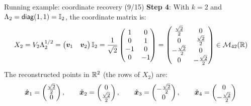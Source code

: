 \documentclass[aspectratio=169]{beamer}\usepackage[]{graphicx}\usepackage[]{xcolor}
\begin{document}
\begin{frame}{Running example: coordinate recovery (9/15)}
\textbf{Step 4}: With $k = 2$ and $\Lambda_2 = \mathsf{diag}(1, 1) = \mathbb{I}_2$, the coordinate matrix is:
\[
X_2 = V_2 \Lambda_2^{1/2} = \begin{pmatrix} \bm{v}_1 & \bm{v}_2 \end{pmatrix} \mathbb{I}_2 =
\frac{1}{\sqrt{2}}\begin{pmatrix}
1 & 0 \\
0 & 1 \\
-1 & 0 \\
0 & -1
\end{pmatrix}
= \begin{pmatrix}
\frac{\sqrt{2}}{2} & 0 \\
0 & \frac{\sqrt{2}}{2} \\
-\frac{\sqrt{2}}{2} & 0 \\
0 & -\frac{\sqrt{2}}{2}
\end{pmatrix} \in \mathcal{M}_{42}(\mathbb{R})
\]
\vfill
The reconstructed points in $\mathbb{R}^2$ (the rows of $X_2$) are:
\[
\hat{\bm{x}}_1 = \begin{pmatrix} \frac{\sqrt{2}}{2} \\ 0 \end{pmatrix}, \qquad
\hat{\bm{x}}_2 = \begin{pmatrix} 0 \\ \frac{\sqrt{2}}{2} \end{pmatrix}, \qquad
\hat{\bm{x}}_3 = \begin{pmatrix} -\frac{\sqrt{2}}{2} \\ 0 \end{pmatrix}, \qquad
\hat{\bm{x}}_4 = \begin{pmatrix} 0 \\ -\frac{\sqrt{2}}{2} \end{pmatrix}
\]
\end{frame}
\end{document}
